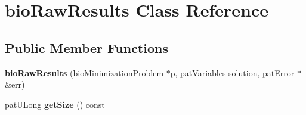 \hypertarget{classbio_raw_results}{}\section{bio\+Raw\+Results Class Reference}
\label{classbio_raw_results}
\subsection*{Public Member Functions}
\begin{DoxyCompactItemize}
\item 
\mbox{\label{classbio_raw_results_ae10e315160da42a295874253e416345b}} 
{\bfseries bio\+Raw\+Results} (\hyperlink{classbio_minimization_problem}{bio\+Minimization\+Problem} $\ast$p, pat\+Variables solution, pat\+Error $\ast$\&err)
\item 
\mbox{\label{classbio_raw_results_ae1cd385d1e5689b883afab676e96510f}} 
pat\+U\+Long {\bfseries get\+Size} () const
\end{DoxyCompactItemize}
